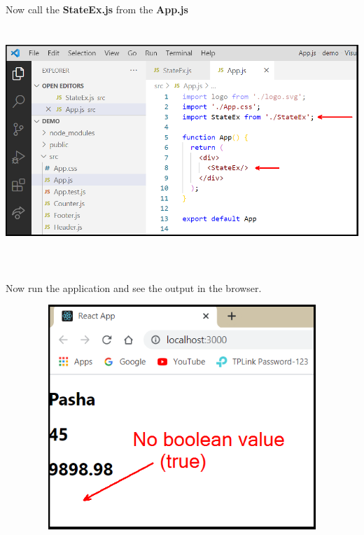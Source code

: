 \documentclass{article}
\begin{document}
\noindent 

\noindent 

\noindent 

\noindent 

\noindent \\
Now call the \textbf{StateEx.js} from the \textbf{App.js}

\begin{center}
	\noindent \includegraphics*[width=6.26in, height=3.40in]{IMG-09-03}
\end{center}

\noindent 

\noindent \\
Now run the application and see the output in the browser.

\begin{center}
	\noindent \includegraphics*[width=5.25in, height=3.34in]{IMG-09-04}
\end{center}
\end{document}

